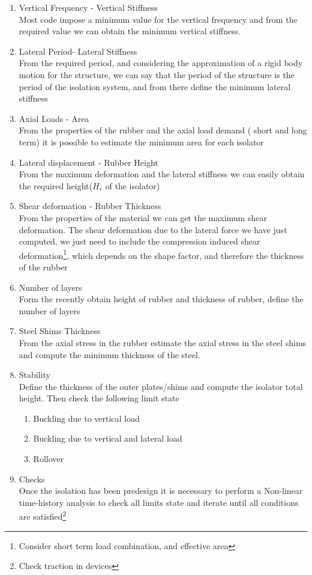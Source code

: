 \begin{enumerate}
\item{Vertical Frequency - Vertical Stiffness}\\
Most code impose a minimum value for the vertical frequency  and from the required value we can obtain the minimum vertical stiffness.
\item{Lateral Period- Lateral Stiffness}\\
From the required period, and considering the approximation of a rigid body motion for the structure, we can say that the period of the structure is the period of the isolation system, and from there define the minimum lateral stiffness
\item{Axial Loads - Area}\\
From the properties of the rubber and the axial load demand ( short and long term) it is possible to estimate the minimum area for each isolator
\item{Lateral displacement - Rubber Height}\\
From the maximum deformation and the lateral stiffness we can easily obtain the required  height($H_r$ of the isolator)
\item{Shear deformation - Rubber Thickness}\\
From the properties of the material we can get the maximum shear deformation. The shear deformation due to the lateral force we have just computed, we just need to include the compression induced shear deformation\footnote{Consider short term load combination, and effective area}, which depends on the shape factor, and therefore the thickness of the rubber
\item{Number of layers}\\
Form the recently obtain height of rubber and thickness of rubber, define the number of layers
\item {Steel Shims Thickness}\\
From the axial stress in the rubber estimate the axial stress in the steel shims and compute the minimum thickness of the steel.
\item{Stability}\\
Define the thickness of the outer plates/shims and compute the isolator total height. Then check the following limit state
\begin{enumerate}
    \item Buckling due to vertical load
    \item Buckling due to vertical and lateral load
    \item Rollover
\end{enumerate}
\item {Checks}\\
Once the isolation has been predesign it is necessary to perform a Non-linear time-history analysis to check all limits state and iterate until all conditions are satisfied\footnote{ Check traction in devices}
\end{enumerate}
